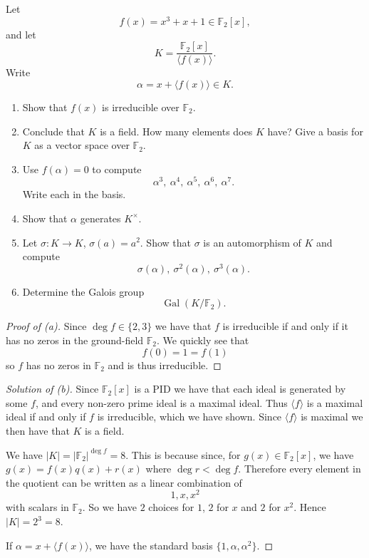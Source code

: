 \begin{prob}
    Let 
    \[
        f(x) = x^3 + x + 1 \in \mathbb F_2[x],
    \]
    and let 
    \[
        K = \frac{\mathbb F_2[x]}{\langle f(x) \rangle}.
    \]
    Write 
    \[
        \alpha = x + \langle f(x) \rangle \in K.
    \]

    \begin{enumerate}[label=\alph*)]
        \item Show that $f(x)$ is irreducible over 
            $\mathbb F_2$.
        \item Conclude that $K$ is a field. How many elements 
            does $K$ have? Give a basis for $K$ as a vector space 
            over $\mathbb F_2$.
        \item Use $f(\alpha) = 0$ to compute 
            \[
                \alpha^3, \ \alpha^4, \ \alpha^5, \ \alpha^6, 
                \ \alpha^7.
            \]
            Write each in the basis. 
        \item Show that $\alpha$ generates $K^\times$. 
        \item Let $\sigma : K \to K$, $\sigma(a) = a^2$. 
            Show that $\sigma$ is an automorphism of $K$ and 
            compute 
            \[
                \sigma(\alpha), \ \sigma^2(\alpha), 
                \ \sigma^3(\alpha).
            \]
        \item Determine the Galois group 
            \[
                \operatorname{Gal}(K/\mathbb F_2).
            \]
    \end{enumerate}
\end{prob}
\begin{proof}[Proof of (a)]
    Since $\deg f \in \{2,3\}$ we have that 
    $f$ is irreducible if and only if it 
    has no zeros in the ground-field 
    $\mathbb F_2$. 
    We quickly see that 
    \[
        f(0) = 1 = f(1)
    \]
    so $f$ has no zeros 
    in $\mathbb F_2$ and is 
    thus irreducible. 
\end{proof}
\begin{proof}[Solution of (b)]
    Since $\mathbb F_2[x]$ is a PID 
    we have that each ideal is generated 
    by some $f$, and every non-zero prime ideal 
    is a maximal ideal. Thus $\langle f \rangle$ is 
    a maximal ideal if and only if $f$ is 
    irreducible, which we have shown. 
    Since $\langle f \rangle$ is maximal we 
    then have that $K$ is a field. 

    We have $|K| = |\mathbb F_2|^{\deg f} = 8$.
    This is because since, for $g(x) \in \mathbb F_2[x]$, 
    we have $g(x) = f(x)q(x) + r(x)$ where 
    $\deg r < \deg f$. Therefore every 
    element in the quotient can be written 
    as a linear combination of 
    \[
        1, x, x^2 
    \]
    with scalars in $\mathbb F_2$. 
    So we have $2$ choices for $1$, 
    $2$ for $x$ and $2$ for $x^2$. 
    Hence $|K| = 2^3 = 8$.

    If $\alpha = x + \langle f(x) \rangle$, we have 
    the standard basis 
    $\{1, \alpha, \alpha^2\}$. 
\end{proof}
